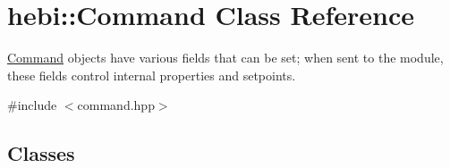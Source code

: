 \hypertarget{classhebi_1_1Command}{}\section{hebi\+:\+:Command Class Reference}
\label{classhebi_1_1Command}


\hyperlink{classhebi_1_1Command}{Command} objects have various fields that can be set; when sent to the module, these fields control internal properties and setpoints.  




{\ttfamily \#include $<$command.\+hpp$>$}

\subsection*{Classes}
